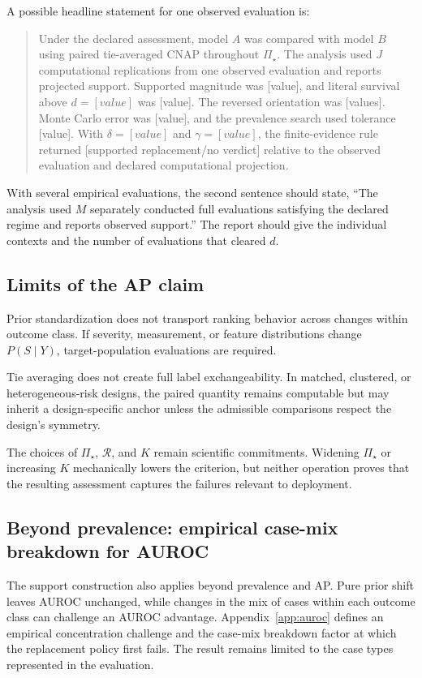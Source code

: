 \documentclass[11pt]{article}
\newcommand{\Regime}{\mathcal{R}}
\newcommand{\PSet}{\Pi_\star}
\theoremstyle{remark}
\begin{document}
A possible headline statement for one observed evaluation is:
\begin{quote}
Under the declared assessment, model $A$ was compared with model $B$ using paired tie-averaged CNAP throughout $\PSet$. The analysis used $J$ computational replications from one observed evaluation and reports projected support. Supported magnitude was [value], and literal survival above $d=[value]$ was [value]. The reversed orientation was [values]. Monte Carlo error was [value], and the prevalence search used tolerance [value]. With $\delta=[value]$ and $\gamma=[value]$, the finite-evidence rule returned [supported replacement/no verdict] relative to the observed evaluation and declared computational projection.
\end{quote}
With several empirical evaluations, the second sentence should state, ``The analysis used $M$ separately conducted full evaluations satisfying the declared regime and reports observed support.'' The report should give the individual contexts and the number of evaluations that cleared $d$.

\subsection{Limits of the AP claim}

Prior standardization does not transport ranking behavior across changes within outcome class. If severity, measurement, or feature distributions change $P(S\mid Y)$, target-population evaluations are required.

Tie averaging does not create full label exchangeability. In matched, clustered, or heterogeneous-risk designs, the paired quantity remains computable but may inherit a design-specific anchor unless the admissible comparisons respect the design's symmetry.

The choices of $\PSet$, $\Regime$, and $K$ remain scientific commitments. Widening $\PSet$ or increasing $K$ mechanically lowers the criterion, but neither operation proves that the resulting assessment captures the failures relevant to deployment.

\subsection{Beyond prevalence: empirical case-mix breakdown for AUROC}
\label{sec:auroc-outlook}

The support construction also applies beyond prevalence and AP. Pure prior shift leaves AUROC unchanged, while changes in the mix of cases within each outcome class can challenge an AUROC advantage. Appendix~\ref{app:auroc} defines an empirical concentration challenge and the case-mix breakdown factor at which the replacement policy first fails. The result remains limited to the case types represented in the evaluation.
\end{document}
